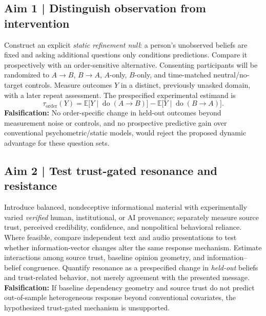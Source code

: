 \documentclass[10pt,letterpaper]{article}
\newcommand{\order}{\mathrm{order}}
\begin{document}
\subsection*{Aim 1 \;|\; Distinguish observation from intervention}
Construct an explicit \emph{static refinement null}: a person's unobserved beliefs are fixed and asking additional questions only conditions predictions. Compare it prospectively with an order-sensitive alternative. Consenting participants will be randomized to $A\!\to\!B$, $B\!\to\!A$, $A$-only, $B$-only, and time-matched neutral/no-target controls. Measure outcomes $Y$ in a distinct, previously unasked domain, with a later repeat assessment. The prespecified experimental estimand is
\vspace{-4pt}
\begin{equation}
\tau_{\order}(Y)=\mathbb E\big[Y\mid\operatorname{do}(A\!\to\!B)\big]-
                   \mathbb E\big[Y\mid\operatorname{do}(B\!\to\!A)\big].
\end{equation}
\vspace{-3pt}
\textbf{Falsification:} No order-specific change in held-out outcomes beyond measurement noise or controls, and no prospective predictive gain over conventional psychometric/static models, would reject the proposed dynamic advantage for these question sets.

\subsection*{Aim 2 \;|\; Test trust-gated resonance and resistance}
Introduce balanced, nondeceptive informational material with experimentally varied \emph{verified} human, institutional, or AI provenance; separately measure source trust, perceived credibility, confidence, and nonpolitical behavioral reliance. Where feasible, compare independent text and audio presentations to test whether information-vector changes alter the same response mechanism. Estimate interactions among source trust, baseline opinion geometry, and information--belief congruence. Quantify resonance as a prespecified change in \emph{held-out} beliefs and trust-related behavior, not merely agreement with the presented message. \textbf{Falsification:} If baseline dependency geometry and source trust do not predict out-of-sample heterogeneous response beyond conventional covariates, the hypothesized trust-gated mechanism is unsupported.
\end{document}
